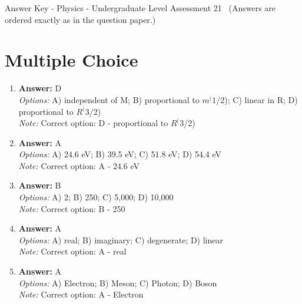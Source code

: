 \documentclass[12pt]{article}
\begin{document}
\begin{center}
Answer Key - Physics - Undergraduate Level Assessment 21 \
\small (Answers are ordered exactly as in the question paper.)
\end{center}

\section*{Multiple Choice}
\begin{enumerate}[label=\arabic*.]
\item \textbf{Answer:} D
\\ \textit{Options:} A) independent of M; B) proportional to $m^(1$/2); C) linear in R; D) proportional to $R^(3$/2)
\\ \textit{Note:} Correct option: D - proportional to $R^(3$/2)
\item \textbf{Answer:} A
\\ \textit{Options:} A) 24.6 eV; B) 39.5 eV; C) 51.8 eV; D) 54.4 eV
\\ \textit{Note:} Correct option: A - 24.6 eV
\item \textbf{Answer:} B
\\ \textit{Options:} A) 2; B) 250; C) 5,000; D) 10,000
\\ \textit{Note:} Correct option: B - 250
\item \textbf{Answer:} A
\\ \textit{Options:} A) real; B) imaginary; C) degenerate; D) linear
\\ \textit{Note:} Correct option: A - real
\item \textbf{Answer:} A
\\ \textit{Options:} A) Electron; B) Meson; C) Photon; D) Boson
\\ \textit{Note:} Correct option: A - Electron
\end{enumerate}
\end{document}
